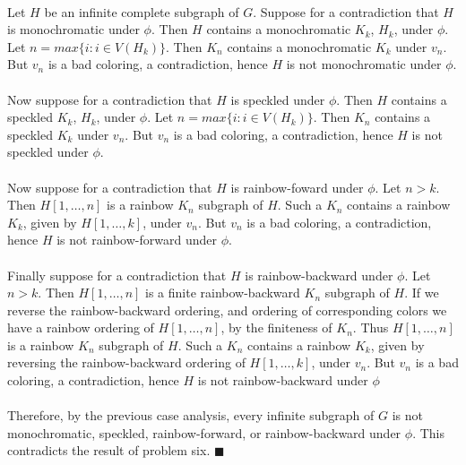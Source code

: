 \documentclass[letterpaper,12pt,oneside,onecolumn]{article}
\begin{document}
\paragraph{}
Let $H$ be an infinite complete subgraph of $G$. Suppose for a contradiction that $H$ is monochromatic under $\phi$. Then $H$ contains a monochromatic $K_k$, $H_k$, under $\phi$. Let $n = max\{ i : i \in V(H_k)\}$. Then $K_n$  contains a monochromatic $K_k$ under $v_n$. But $v_n$ is a bad coloring, a contradiction, hence $H$ is not monochromatic under $\phi$.
\paragraph{}
Now suppose for a contradiction that $H$ is speckled under $\phi$. Then $H$ contains a speckled $K_k$, $H_k$, under $\phi$. Let $n = max\{ i : i \in V(H_k)\}$. Then $K_n$  contains a speckled $K_k$ under $v_n$. But $v_n$ is a bad coloring, a contradiction, hence $H$ is not speckled under $\phi$.
\paragraph{}
Now suppose for a contradiction that $H$ is rainbow-foward under $\phi$. Let $n > k$. Then $H[1,\dots,n]$ is a rainbow $K_n$ subgraph of $H$. Such a $K_n$ contains a rainbow $K_k$, given by $H[1,\dots,k]$, under $v_n$. But $v_n$ is a bad coloring, a contradiction, hence $H$ is not rainbow-forward under $\phi$.
\paragraph{}
Finally suppose for a contradiction that $H$ is rainbow-backward under $\phi$. Let $n > k$. Then $H[1,\dots,n]$ is a finite rainbow-backward $K_n$ subgraph of $H$. If we reverse the rainbow-backward ordering, and ordering of corresponding colors we have a rainbow ordering of $H[1,\dots,n]$, by the finiteness of $K_n$. Thus $H[1,\dots, n]$ is a rainbow $K_n$ subgraph of $H$. Such a $K_n$ contains a rainbow $K_k$, given by reversing the rainbow-backward ordering of $H[1,\dots,k]$, under $v_n$. But $v_n$ is a bad coloring, a contradiction, hence $H$ is not rainbow-backward under $\phi$
\paragraph{}
Therefore, by the previous case analysis, every infinite subgraph of $G$ is not monochromatic, speckled, rainbow-forward, or rainbow-backward under $\phi$. This contradicts the result of problem six. $\blacksquare$
\end{document}
